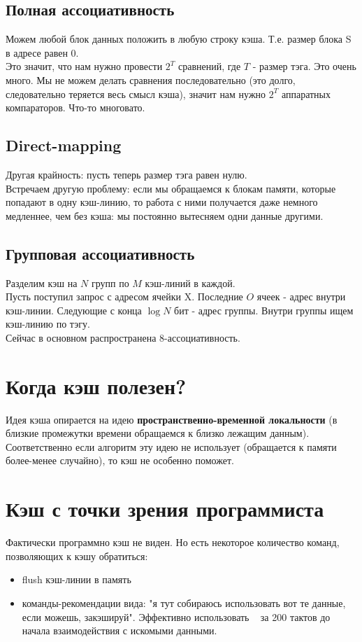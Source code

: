 \documentclass[12pt, a4paper]{article}
\begin{document}
\subsection{Полная ассоциативность}
Можем любой блок данных положить в любую строку кэша. Т.е. размер блока S в адресе равен 0.\\
Это значит, что нам нужно провести $2^T$ сравнений, где $T$ - размер тэга. Это очень много. Мы не можем делать сравнения последовательно (это долго, следовательно теряется весь смысл кэша), значит нам нужно $2^T$ аппаратных компараторов. Что-то многовато.
\subsection{Direct-mapping}
Другая крайность: пусть теперь размер тэга равен нулю.\\ Встречаем другую проблему: если мы обращаемся к блокам памяти, которые попадают в одну кэш-линию, то работа с ними получается даже немного медленнее, чем без кэша: мы постоянно вытесняем одни данные другими.
\subsection{Групповая ассоциативность}
Разделим кэш на $N$ групп по $M$ кэш-линий в каждой.\\
Пусть поступил запрос с адресом ячейки X. Последние $O$ ячеек - адрес внутри кэш-линии. Следующие с конца $\log N$ бит - адрес группы. Внутри группы ищем кэш-линию по тэгу.\\
Сейчас в основном распространена 8-ассоциативность.
\section{Когда кэш полезен?}
Идея кэша опирается на идею \textbf{пространственно-временной локальности} (в близкие промежутки времени обращаемся к близко лежащим данным). Соответственно если алгоритм эту идею не использует (обращается к памяти более-менее случайно), то кэш не особенно поможет.
\section{Кэш с точки зрения программиста}
Фактически программно кэш не виден. Но есть некоторое количество команд, позволяющих к кэшу обратиться:
\begin{itemize}
    \item flush кэш-линии в память
    \item команды-рекомендации вида: "я тут собираюсь использовать вот те данные, если можешь, закэшируй". Эффективно использовать ~ за 200 тактов до начала взаимодействия с искомыми данными.
\end{itemize}
\end{document}
